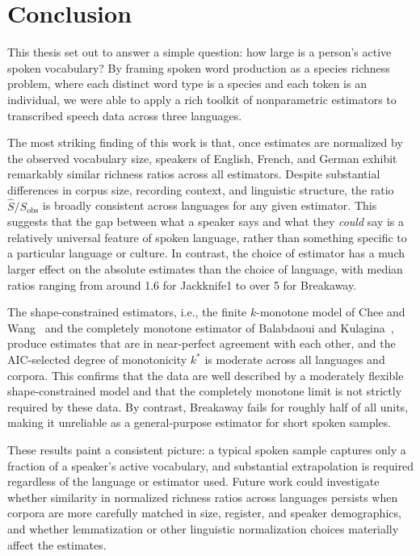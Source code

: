 ﻿\documentclass{article}
\begin{document}
\clearpage
\section{Conclusion}\label{sec:conclusion}

This thesis set out to answer a simple question: how large is a person's active spoken vocabulary? By framing spoken word production as a species richness problem, where each distinct word type is a species and each token is an individual, we were able to apply a rich toolkit of nonparametric estimators to transcribed speech data across three languages.

\vspace{1em}

The most striking finding of this work is that, once estimates are normalized by the observed vocabulary size, speakers of English, French, and German exhibit remarkably similar richness ratios across all estimators. Despite substantial differences in corpus size, recording context, and linguistic structure, the ratio $\hat{S}/S_{\text{obs}}$ is broadly consistent across languages for any given estimator. This suggests that the gap between what a speaker says and what they \emph{could} say is a relatively universal feature of spoken language, rather than something specific to a particular language or culture. In contrast, the choice of estimator has a much larger effect on the absolute estimates than the choice of language, with median ratios ranging from around 1.6 for Jackknife1 to over 5 for Breakaway.

\vspace{1em}

The shape-constrained estimators, i.e., the finite $k$-monotone model of Chee and Wang~\cite{CheeWang2016} and the completely monotone estimator of Balabdaoui and Kulagina~\cite{BalabdaouiKulagina2020}, produce estimates that are in near-perfect agreement with each other, and the AIC-selected degree of monotonicity $k^*$ is moderate across all languages and corpora. This confirms that the data are well described by a moderately flexible shape-constrained model and that the completely monotone limit is not strictly required by these data. By contrast, Breakaway fails for roughly half of all units, making it unreliable as a general-purpose estimator for short spoken samples.

\vspace{1em}

These results paint a consistent picture: a typical spoken sample captures only a fraction of a speaker's active vocabulary, and substantial extrapolation is required regardless of the language or estimator used. Future work could investigate whether similarity in normalized richness ratios across languages persists when corpora are more carefully matched in size, register, and speaker demographics, and whether lemmatization or other linguistic normalization choices materially affect the estimates.
\end{document}
